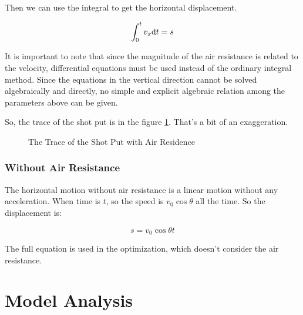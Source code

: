 \documentclass{article}
\begin{document}
Then we can use the integral to get the horizontal displacement.

\begin{equation}
    \int^t_0v_x\mathrm{d} t=s
\end{equation}

It is important to note that since the magnitude of the air resistance is related to the velocity, differential equations must be used instead of the ordinary integral method. Since the equations in the vertical direction cannot be solved algebraically and directly, no simple and explicit algebraic relation among the parameters above can be given.

So, the trace of the shot put is in the figure \ref{fig:trace-with-residence}. That's a bit of an exaggeration.

\begin{figure}[H]
    \centering
    \caption{The Trace of the Shot Put with Air Residence}
    \label{fig:trace-with-residence}
\end{figure}

\subsubsection{Without Air Resistance}

The horizontal motion without air resistance is a linear motion without any acceleration. When time is $t$, so the speed is $v_0\cos\theta$ all the time. So the displacement is:

\begin{equation}
    s=v_0\cos\theta t
\end{equation}

The full equation is used in the optimization, which doesn't consider the air resistance.

\section{Model Analysis}
\end{document}
